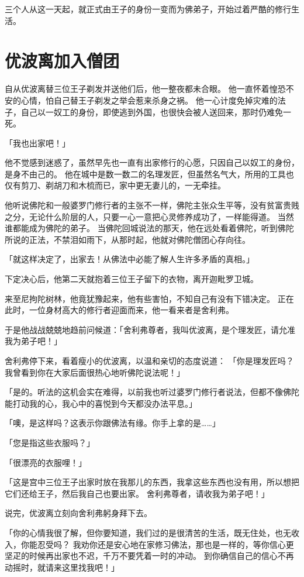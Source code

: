 \documentclass[twoside,openany]{book}
\begin{document}
三个人从这一天起，就正式由王子的身份一变而为佛弟子，开始过着严酷的修行生活。

\section{优波离加入僧团}\label{sec9.3}

自从优波离替三位王子剃发并送他们后，他一整夜都未合眼。
他一直怀着惶恐不安的心情，怕自己替王子剃发之举会惹来杀身之祸。
他一心计度免掉灾难的法子，自己以一奴工的身份，即使逃到外国，也很快会被人送回来，那时仍难免一死。

「我也出家吧！」

他不觉感到迷惑了，虽然早先也一直有出家修行的心愿，只因自己以奴工的身份，是身不由己的。
他在城中是数一数二的名理发匠，但虽然名气大，所用的工具也仅有剪刀、剃胡刀和木梳而已，家中更无妻儿的，一无牵挂。

他听说佛陀和一般婆罗门修行者的主张不一样，佛陀主张众生平等，没有贫富贵贱之分，无论什么阶层的人，只要一心一意把心灵修养成功了，一样能得道。
当然谁都能成为佛陀的弟子。
当佛陀回城说法的那天，他在远处看着佛陀，听到佛陀所说的正法，不禁泪如雨下，从那时起，他就对佛陀僧团心存向往。

「就这样决定了，出家去！从佛法中必能了解人生许多矛盾的真相。」

下定决心后，他第二天就抱着三位王子留下的衣物，离开迦毗罗卫城。

来至尼拘陀树林，他竟犹豫起来，他有些害怕，不知自己有没有下错决定。
正在此时，一位身材高大的修行者迎面而来，他一看来者是舍利弗。

于是他战战兢兢地趋前问候道：「舍利弗尊者，我叫优波离，是个理发匠，请允准我为弟子吧！」

舍利弗停下来，看着瘦小的优波离，以温和亲切的态度说道：
「你是理发匠吗？我曾看到你在大家后面很热心地听佛陀说法呢！」

「是的。听法的这机会实在难得，以前我也听过婆罗门修行者说法，但都不像佛陀能打动我的心，我心中的喜悦到今天都没办法平息。」

「噢，是这样吗？这表示你跟佛法有缘。你手上拿的是……」

「您是指这些衣服吗？」

「很漂亮的衣服哩！」

「这是宫中三位王子出家时放在我那儿的东西，我拿这些东西也没有用，所以想把它们还给王子，然后我自己也要出家。
舍利弗尊者，请收我为弟子吧！」

说完，优波离立刻向舍利弗躬身拜下去。

「你的心情我很了解，但你要知道，我们过的是很清苦的生活，既无住处，也无收入，你能忍受吗？
我劝你还是安心地在家修习佛法，那也是一样的，等你信心更坚疋的时候再出家也不迟，千万不要凭着一时的冲动。
到你确信自己的信心不再动摇时，就请来这里找我吧！」
\end{document}
